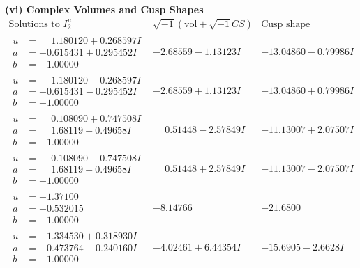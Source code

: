 \documentclass[1p]{elsarticle_modified}
\theoremstyle{definition}
\newcommand{\I}{\sqrt{-1}}
\begin{document}
\newpage\flushleft \textbf{(vi) Complex Volumes and Cusp Shapes}
$$\begin{array}{c|c|c}  
\text{Solutions to }I^u_{2}& \I (\text{vol} + \sqrt{-1}CS) & \text{Cusp shape}\\
 \hline 
\begin{aligned}
u &= \phantom{-}1.180120 + 0.268597 I \\
a &= -0.615431 + 0.295452 I \\
b &= -1.00000\phantom{ +0.000000I}\end{aligned}
 & -2.68559 - 1.13123 I & -13.04860 - 0.79986 I \\ \hline\begin{aligned}
u &= \phantom{-}1.180120 - 0.268597 I \\
a &= -0.615431 - 0.295452 I \\
b &= -1.00000\phantom{ +0.000000I}\end{aligned}
 & -2.68559 + 1.13123 I & -13.04860 + 0.79986 I \\ \hline\begin{aligned}
u &= \phantom{-}0.108090 + 0.747508 I \\
a &= \phantom{-}1.68119 + 0.49658 I \\
b &= -1.00000\phantom{ +0.000000I}\end{aligned}
 & \phantom{-}0.51448 - 2.57849 I & -11.13007 + 2.07507 I \\ \hline\begin{aligned}
u &= \phantom{-}0.108090 - 0.747508 I \\
a &= \phantom{-}1.68119 - 0.49658 I \\
b &= -1.00000\phantom{ +0.000000I}\end{aligned}
 & \phantom{-}0.51448 + 2.57849 I & -11.13007 - 2.07507 I \\ \hline\begin{aligned}
u &= -1.37100\phantom{ +0.000000I} \\
a &= -0.532015\phantom{ +0.000000I} \\
b &= -1.00000\phantom{ +0.000000I}\end{aligned}
 & -8.14766\phantom{ +0.000000I} & -21.6800\phantom{ +0.000000I} \\ \hline\begin{aligned}
u &= -1.334530 + 0.318930 I \\
a &= -0.473764 - 0.240160 I \\
b &= -1.00000\phantom{ +0.000000I}\end{aligned}
 & -4.02461 + 6.44354 I & -15.6905 - 2.6628 I \\ \hline\begin{aligned}

\end{aligned}
\end{array}$$
\end{document}
